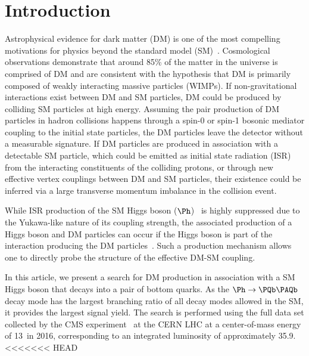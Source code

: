 \section{Introduction} \label{intro}

Astrophysical evidence for dark matter (DM) is one of the most compelling motivations for
physics beyond the standard model
(SM)~\cite{dm1,dm2,dm3}. Cosmological observations demonstrate that
around 85\% of the matter in the universe is comprised of DM
\cite{planck} and are consistent with the hypothesis that DM is primarily composed of
weakly interacting massive particles (WIMPs). If non-gravitational
interactions exist between DM and SM particles, DM could be produced
by colliding SM particles at high energy. Assuming the pair
production of DM particles in hadron collisions happens through a
spin-0 or spin-1 bosonic mediator coupling to the initial state particles, the DM particles leave the
detector without a measurable signature. If DM particles are produced in association with a detectable SM particle, which could be emitted
as initial state radiation (ISR) from the interacting constituents of the colliding protons, or through
new effective vertex couplings between DM and SM particles, their
existence could be inferred via a large transverse momentum imbalance in the collision event. 


While ISR production of the SM Higgs boson ($\Ph$)~\cite{HiggsObs_ATLAS, HiggsObs_CMS, HiggsObs_CMS_Long} is highly suppressed due to the Yukawa-like nature of its coupling strength, 
the associated production of a Higgs boson and DM particles
can occur if the
Higgs boson is part of the interaction producing the DM particles~\cite{monoHiggs3,2HDM,PhysRevD.89.075017}.
Such a production mechanism allows one to directly probe the structure of the effective DM-SM coupling.

In this article, we  present a search for DM production in association
with a SM Higgs boson that decays into a pair of bottom quarks. As the 
$\Ph\rightarrow \bb$ decay mode has the largest branching ratio of all decay modes allowed in the SM, it provides the largest signal yield. The search is performed using the full data set collected by the CMS experiment~\cite{CMSdetector} at the CERN LHC at a center-of-mass energy of 13\TeV~in 2016, corresponding to an integrated luminosity of approximately 35.9\fbinv. 
<<<<<<< HEAD

